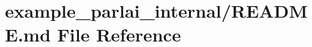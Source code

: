 \hypertarget{example__parlai__internal_2README_8md}{}\section{example\+\_\+parlai\+\_\+internal/\+R\+E\+A\+D\+ME.md File Reference}
\label{example__parlai__internal_2README_8md}
